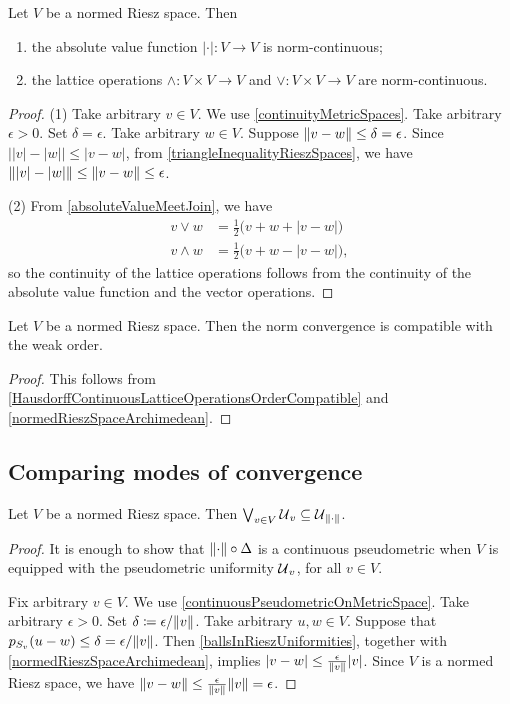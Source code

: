 \begin{proposition} \label{normContinuityLatticeOperations}
Let $V$ be a normed Riesz space. Then
\begin{enumerate}
\item the absolute value function $|\cdot|: V\to V$ is norm-continuous;
\item the lattice operations $\wedge: V\times V\to V$ and $\vee: V\times V \to V$ are norm-continuous.
\end{enumerate}
\end{proposition}
\begin{proof}
(1) Take arbitrary $v\in V$. We use \ref{continuityMetricSpaces}. Take arbitrary $\epsilon > 0$. Set $\delta = \epsilon$. Take arbitrary $w\in V$. Suppose $\lVert v-w\rVert\leq \delta = \epsilon$. Since $\big||v| - |w|\big| \leq |v-w|$, from \ref{triangleInequalityRieszSpaces}, we have $\lVert|v|-|w|\rVert \leq \lVert v-w\rVert \leq \epsilon$.

(2) From \ref{absoluteValueMeetJoin}, we have
\begin{align*}
v \vee w &= \frac{1}{2}\big(v+w + |v - w|\big) \\
v \wedge w &= \frac{1}{2}\big(v+w - |v - w|\big),
\end{align*}
so the continuity of the lattice operations follows from the continuity of the absolute value function and the vector operations.
\end{proof}
\begin{corollary} \label{normConvergenceCompatibleWeakOrder}
Let $V$ be a normed Riesz space. Then the norm convergence is compatible with the weak order.
\end{corollary}
\begin{proof}
This follows from \ref{HausdorffContinuousLatticeOperationsOrderCompatible} and \ref{normedRieszSpaceArchimedean}.
\end{proof}

\subsection{Comparing modes of convergence}
\begin{proposition} \label{RieszUniformityNormUniformityCompared}
Let $V$ be a normed Riesz space. Then $\bigvee_{v\in V}\operatorname{\mathcal{U}}_{v} \subseteq \operatorname{\mathcal{U}}_{\lVert\cdot\rVert}$.
\end{proposition}
\begin{proof}
It is enough to show that $\lVert\cdot\rVert\circ \Delta$ is a continuous pseudometric when $V$ is equipped with the pseudometric uniformity $\operatorname{\mathcal{U}}_v$, for all $v\in V$.

Fix arbitrary $v\in V$. We use \ref{continuousPseudometricOnMetricSpace}. Take arbitrary $\epsilon >0$. Set $\delta \coloneqq \epsilon / \lVert v\rVert$. Take arbitrary $u,w\in V$. Suppose that $p_{S_v}(u-w) \leq \delta = \epsilon / \lVert v\rVert$. Then \ref{ballsInRieszUniformities}, together with \ref{normedRieszSpaceArchimedean}, implies $|v-w| \leq \frac{\epsilon}{\lVert v\rVert}|v|$. Since $V$ is a normed Riesz space, we have $\lVert v-w\rVert \leq \frac{\epsilon}{\lVert v\rVert}\lVert v\rVert = \epsilon$.
\end{proof}

